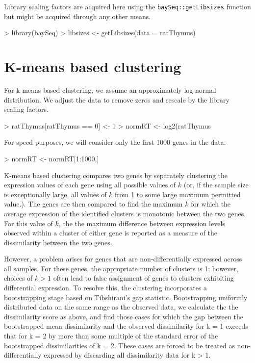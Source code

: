 \documentclass[a4paper]{article}
\begin{document}
Library scaling factors are acquired here using the \verb'baySeq::getLibsizes' function but might be acquired through any other means.

\begin{Schunk}
\begin{Sinput}
>   library(baySeq)
>   libsizes <- getLibsizes(data = ratThymus)
\end{Sinput}
\end{Schunk}

\section{K-means based clustering}

For k-means based clustering, we assume an approximately log-normal distribution. We adjust the data to remove zeros and rescale by the library scaling factors.
\begin{Schunk}
\begin{Sinput}
> ratThymus[ratThymus == 0] <- 1
> normRT <- log2(ratThymus %*% diag(1/libsizes) * mean(libsizes))
\end{Sinput}
\end{Schunk}

For speed purposes, we  will consider only the first 1000 genes in the data.
\begin{Schunk}
\begin{Sinput}
> normRT <- normRT[1:1000,]
\end{Sinput}
\end{Schunk}

K-means based clustering compares two genes by separately clustering the expression values of each gene using all possible values of $k$ (or, if the sample size is exceptionally large, all values of $k$ from 1 to some large maximum permitted value.). The genes are then compared to find the maximum $k$ for which the average expression of the identified clusters is monotonic between the two genes. For this value of $k$, the the maximum difference between expression levels observed within a cluster of either gene is reported as a measure of the dissimilarity between the two genes.

However, a problem arises for genes that are non-differentially expressed across all samples. For these genes, the appropriate number of clusters is 1; however, choices of $k > 1$ often lead to false assignment of genes to clusters exhibiting differential expression. To resolve this, the clustering incorporates a bootstrapping stage based on Tibshirani's gap statistic. Bootstrapping uniformly distributed data on the same range as the observed data, we calculate the the dissimilarity score as above, and find those cases for which the gap between the bootstrapped mean dissimilarity and the observed dissimilarity for k = 1 exceeds that for k = 2 by more than some multiple of the standard error of the bootstrapped dissimilarities of k = 2. These cases are forced to be treated as non-differentially expressed by discarding all dissimilarity data for k > 1.
\end{document}
